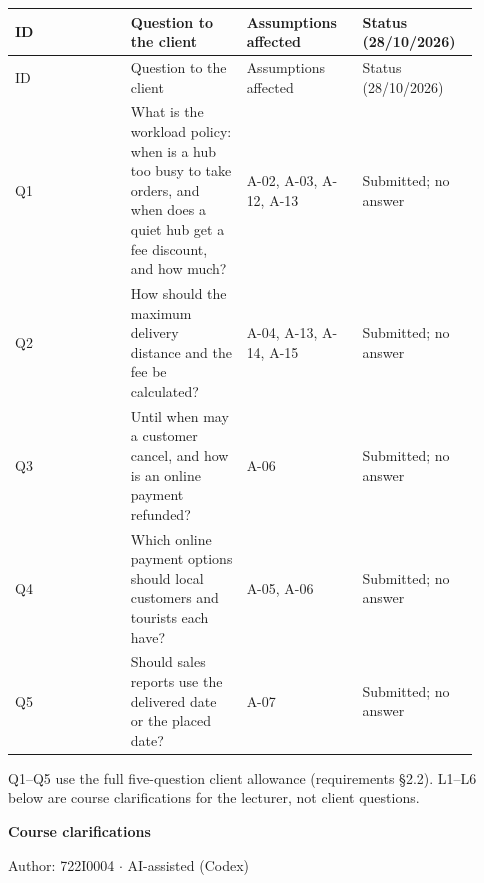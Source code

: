 \begin{longtable}{>{\raggedright\arraybackslash}p{0.2300\linewidth}>{\raggedright\arraybackslash}p{0.2300\linewidth}>{\raggedright\arraybackslash}p{0.2300\linewidth}>{\raggedright\arraybackslash}p{0.2300\linewidth}}
ID & Question to the client & Assumptions affected & Status (28/10/2026) \\
\hline\endfirsthead
ID & Question to the client & Assumptions affected & Status (28/10/2026) \\
\hline\endhead
Q1 & What is the workload policy: when is a hub too busy to take orders, and when does a quiet hub get a fee discount, and how much? & A-02, A-03, A-12, A-13 & Submitted; no answer \\
Q2 & How should the maximum delivery distance and the fee be calculated? & A-04, A-13, A-14, A-15 & Submitted; no answer \\
Q3 & Until when may a customer cancel, and how is an online payment refunded? & A-06 & Submitted; no answer \\
Q4 & Which online payment options should local customers and tourists each have? & A-05, A-06 & Submitted; no answer \\
Q5 & Should sales reports use the delivered date or the placed date? & A-07 & Submitted; no answer \\
\end{longtable}
Q1--Q5 use the full five-question client allowance (requirements \S{}2.2). L1--L6 below are course clarifications for the lecturer, not client questions.

\textbf{Course clarifications}

Author: 722I0004 \ensuremath{\cdot} AI-assisted (Codex)

